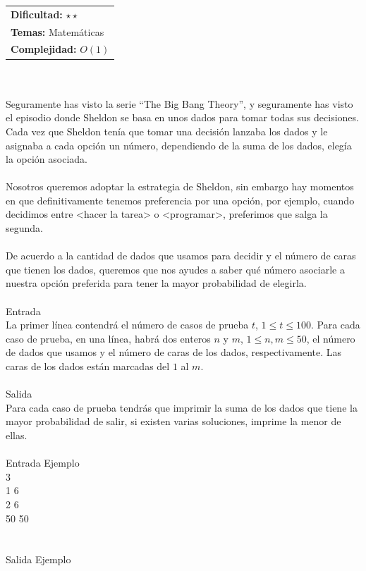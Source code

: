 \documentclass[12pt]{article}
\begin{document}
\hfill
\begin{tabular}{@{}l@{}}
\textbf{Dificultad:} $\star \star$ \\
\textbf{Temas:} Matemáticas \\
\textbf{Complejidad:} $O(1)$
\end{tabular}\\
\\
Seguramente has visto la serie “The Big Bang Theory”, y seguramente has visto el episodio donde Sheldon se basa en unos dados para tomar todas sus decisiones. Cada vez que Sheldon tenía que tomar una decisión lanzaba los dados y le asignaba a cada opción un número, dependiendo de la suma de los dados, elegía la opción asociada.\\
\\Nosotros queremos adoptar la estrategia de Sheldon, sin embargo hay momentos en que definitivamente tenemos preferencia por una opción, por ejemplo, cuando decidimos entre <hacer la tarea> o <programar>, preferimos que salga la segunda.\\
\\De acuerdo a la cantidad de dados que usamos para decidir y el número de caras que tienen los dados, queremos que nos ayudes a saber qué número asociarle a nuestra opción preferida para tener la mayor probabilidad de elegirla.
\\
\\
\textrm{\large Entrada}
\\
La primer línea contendrá el número de casos de prueba $t$, $1 ≤ t ≤ 100$. Para cada caso de prueba, en una línea, habrá dos enteros $n$ y $m$, $1 ≤ n, m ≤ 50$, el número de dados que usamos y el número de caras de los dados, respectivamente. Las caras de los dados están marcadas del $1$ al $m$.
\\
\\
\textrm{\large Salida}
\\
Para cada caso de prueba tendrás que imprimir la suma de los dados que tiene la mayor probabilidad de salir, si existen varias soluciones, imprime la menor de ellas.
\\
\\
\textrm{\large Entrada Ejemplo}
\\
3\\
1 6\\
2 6\\
50 50\\
\\
\\
\textrm{\large Salida Ejemplo}
\\
\end{document}
